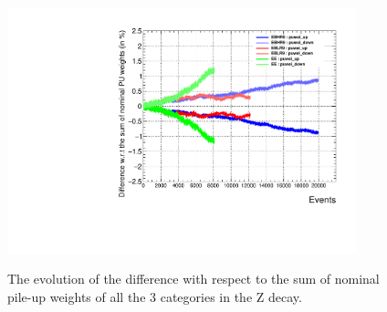 	\begin{figure}[p]
	  \begin{center}
	    \includegraphics[width=0.9\textwidth]{Fig/puwei_check/puwei_history_root}\\
	    \bigskip
	    \caption{The evolution of the difference with respect to the sum of nominal pile-up weights of all the 3 categories in the Z decay.}
	  \label{fig:puweihistory}
	  \end{center}
	\end{figure}
 
 	 \clearpage
 	 
